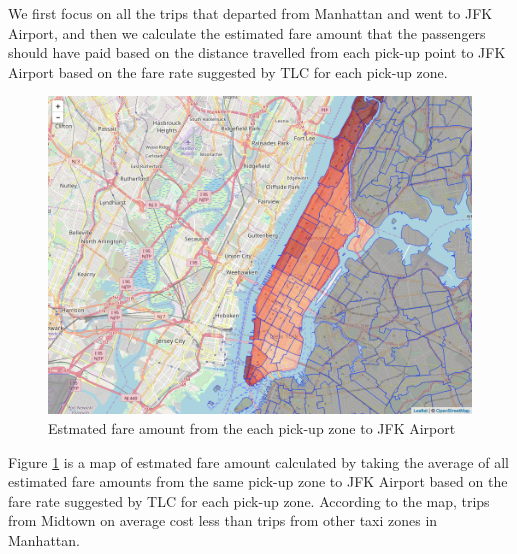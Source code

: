 \documentclass[12pt,twoside]{reedthesis}
\theoremstyle{definition}
\theoremstyle{definition}
\theoremstyle{definition}
\theoremstyle{remark}
\begin{document}
We first focus on all the trips that departed from Manhattan and went to
JFK Airport, and then we calculate the estimated fare amount that the
passengers should have paid based on the distance travelled from each
pick-up point to JFK Airport based on the fare rate suggested by TLC for
each pick-up zone.
\begin{figure}

{\centering \includegraphics[width=5.84in]{figure/to_jfk_fare_vis} 

}

\caption{Estmated fare amount from the each pick-up zone to JFK Airport}\label{fig:to-jfk-fare-vis}
\end{figure}
Figure \ref{fig:to-jfk-fare-vis} is a map of estmated fare amount
calculated by taking the average of all estimated fare amounts from the
same pick-up zone to JFK Airport based on the fare rate suggested by TLC
for each pick-up zone. According to the map, trips from Midtown on
average cost less than trips from other taxi zones in Manhattan.
\end{document}
